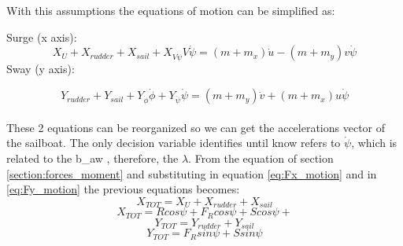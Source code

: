 With this assumptions the equations of motion can be simplified as: \par \noindent
Surge (x axis):
\begin{equation}
       X_{U}+X_{rudder}+X_{sail}+X_{V\Dot{\psi}}V\Dot{\psi}  =(m+m_{x})\Dot{u}-(m+m_{y})v\Dot{\psi}
\end{equation}\label{eq:Fx_motion}
\noindent
Sway (y axis):\par 
\begin{equation}
\label{eq:Fy_motion}
Y_{rudder} + Y_{sail} + Y_{\Dot{\phi}} \Dot{\phi} + Y_{\Dot{\psi}} \Dot{\psi} 
=(m + m_{y})\Dot{v}  + (m + m_{x})u \Dot{\psi}
\end{equation}
\\
These 2 equations can be reorganized so we can get the accelerations vector of the sailboat. The only decision variable identifies until know refers to $\Dot{\psi}$, which is related to the \acrshort{b_aw}%
, therefore, the $\lambda$. 
From the equation of section \ref{section:forces_moment} and substituting in equation \ref{eq:Fx_motion} and in \ref{eq:Fy_motion} the previous equations becomes:
\begin{equation}\label{eq:X_tot}
    X_{TOT}=X_{U}+X_{rudder}+X_{sail}
\end{equation}
\begin{equation}\label{eq:X_tot2}
    X_{TOT}=Rcos\psi+F_{R}cos\psi+Scos\psi+
\end{equation}
\begin{equation}\label{eq:y_tot}
    Y_{TOT}=Y_{rudder}+Y_{sail}
\end{equation}
\begin{equation}
    Y_{TOT}=F_{R}sin\psi+S sin\psi
\end{equation}

